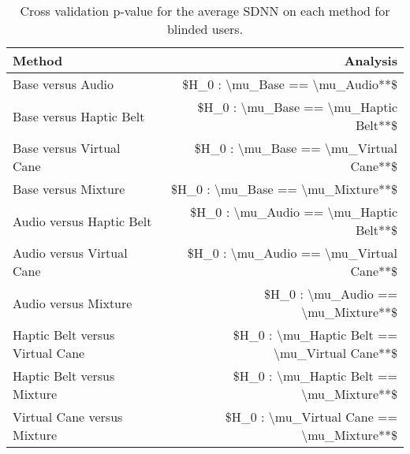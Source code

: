 
\begin{table}[!htb]
\centering
\caption{Cross validation p-value for the average SDNN on each method for blinded users.}
\label{tab:lsd_average_SDNN}
\begin{tabular}{lr}
\toprule
                         Method &                                      Analysis \\
\midrule
              Base versus Audio &               \$H\_0 : \textbackslash mu\_Base == \textbackslash mu\_Audio**\$ \\
        Base versus Haptic Belt &         \$H\_0 : \textbackslash mu\_Base == \textbackslash mu\_Haptic Belt**\$ \\
       Base versus Virtual Cane &        \$H\_0 : \textbackslash mu\_Base == \textbackslash mu\_Virtual Cane**\$ \\
            Base versus Mixture &             \$H\_0 : \textbackslash mu\_Base == \textbackslash mu\_Mixture**\$ \\
       Audio versus Haptic Belt &        \$H\_0 : \textbackslash mu\_Audio == \textbackslash mu\_Haptic Belt**\$ \\
      Audio versus Virtual Cane &       \$H\_0 : \textbackslash mu\_Audio == \textbackslash mu\_Virtual Cane**\$ \\
           Audio versus Mixture &            \$H\_0 : \textbackslash mu\_Audio == \textbackslash mu\_Mixture**\$ \\
Haptic Belt versus Virtual Cane & \$H\_0 : \textbackslash mu\_Haptic Belt == \textbackslash mu\_Virtual Cane**\$ \\
     Haptic Belt versus Mixture &      \$H\_0 : \textbackslash mu\_Haptic Belt == \textbackslash mu\_Mixture**\$ \\
    Virtual Cane versus Mixture &     \$H\_0 : \textbackslash mu\_Virtual Cane == \textbackslash mu\_Mixture**\$ \\
\bottomrule
\end{tabular}
\end{table}

